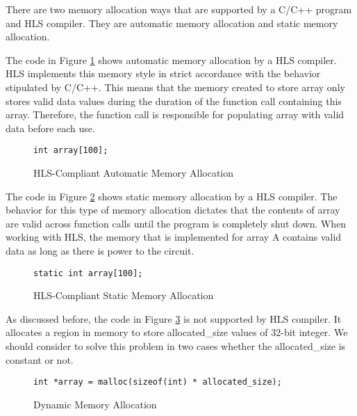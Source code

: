 \documentclass[conference]{IEEEtran}
\begin{document}
There are two memory allocation ways that are supported by a C/C++ program and HLS compiler. They are automatic memory allocation and static memory allocation.

The code in Figure \ref{Automatic-Memory-Allocation} shows automatic memory allocation by a HLS compiler. HLS implements this memory style in strict accordance with the behavior stipulated by C/C++. This means that the memory created to store array only stores valid data values during the duration of the function call containing this array. Therefore, the function call is responsible for populating array with valid data before each use.

\begin{figure}[h]\centering
{\fontsize{8}{8}\selectfont
\begin{lstlisting}[frame=lines]
int array[100];
\end{lstlisting}
}
\caption{HLS-Compliant Automatic Memory Allocation}\label{Automatic-Memory-Allocation}
\end{figure}


The code in Figure \ref{Static-Memory-Allocation} shows static memory allocation by a HLS compiler. The behavior for this type of memory allocation dictates that the contents of array are valid across function calls until the program is completely shut down. When working with HLS, the memory that is implemented for array A contains valid data as long as there is power to the circuit.

\begin{figure}[h]\centering
{\fontsize{8}{8}\selectfont
\begin{lstlisting}[frame=lines]
static int array[100];
\end{lstlisting}
}
\caption{HLS-Compliant Static Memory Allocation}\label{Static-Memory-Allocation}
\end{figure}

As discussed before, the code in Figure \ref{Dynamic-Memory-Allocation} is not supported by HLS compiler. It allocates a region in memory to store allocated\_size  values of 32-bit integer. We should consider to solve this problem in two cases whether the allocated\_size is constant or not.

\begin{figure}[h]\centering
{\fontsize{8}{8}\selectfont
\begin{lstlisting}[frame=lines]
int *array = malloc(sizeof(int) * allocated_size);
\end{lstlisting}
}
\caption{Dynamic Memory Allocation}\label{Dynamic-Memory-Allocation}
\end{figure}
\end{document}

